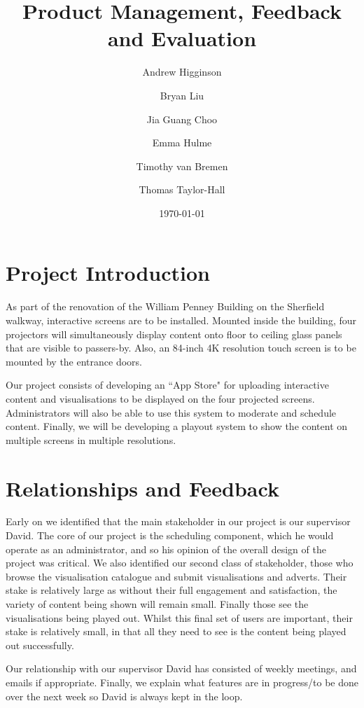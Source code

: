 \documentclass[a4paper]{article}
\begin{document}
\title{Product Management, Feedback and Evaluation}
\author{Andrew Higginson \and Bryan Liu \and Jia Guang Choo \and Emma Hulme \and 
Timothy van Bremen \and Thomas Taylor-Hall}
\date{\today}
\maketitle

\setcounter{table}{0}
\linespread{1.15}

\section{Project Introduction}
As part of the renovation of the William Penney Building on the Sherfield 
walkway, interactive screens are to be installed. Mounted inside the building,
four projectors will simultaneously display content onto floor to ceiling glass
panels that are visible to passers-by. Also, an 84-inch 4K resolution touch 
screen is to be mounted by the entrance doors. 

Our project consists of developing an ``App Store" for uploading interactive 
content and visualisations to be displayed on the four projected screens. 
Administrators will also be able to use this system to moderate and schedule 
content. Finally, we will be developing a playout system to show the content 
on multiple screens in multiple resolutions.

\section{Relationships and Feedback}
Early on we identified that the main stakeholder in our project is our supervisor David. The core of our project is the scheduling component, which he would operate as an administrator, and so his opinion of the overall design of the project was critical. We also identified our second class of stakeholder, those who browse the visualisation catalogue and submit visualisations and adverts. Their stake is relatively large as without their full engagement and satisfaction, the variety of content being shown will remain small. Finally those see the visualisations being played out. Whilst this final set of users are important, their stake is relatively small, in that all they need to see is the content being played out successfully.

Our relationship with our supervisor David has consisted of weekly 
meetings, and emails if appropriate. Finally, we explain what features are in progress/to be done over the next week so David is 
always kept in the loop.
\end{document}

